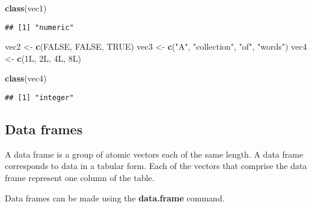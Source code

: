 \documentclass[]{book}
\newenvironment{Shaded}{\begin{snugshade}}{\end{snugshade}}
\newcommand{\KeywordTok}[1]{\textcolor[rgb]{0.13,0.29,0.53}{\textbf{#1}}}
\newcommand{\NormalTok}[1]{#1}
\newcommand{\OtherTok}[1]{\textcolor[rgb]{0.56,0.35,0.01}{#1}}
\newcommand{\StringTok}[1]{\textcolor[rgb]{0.31,0.60,0.02}{#1}}
\begin{document}
\begin{Shaded}
\begin{Highlighting}[]
\KeywordTok{class}\NormalTok{(vec1)}
\end{Highlighting}
\end{Shaded}

\begin{verbatim}
## [1] "numeric"
\end{verbatim}

\begin{Shaded}
\begin{Highlighting}[]
\NormalTok{vec2 <-}\StringTok{ }\KeywordTok{c}\NormalTok{(}\OtherTok{FALSE}\NormalTok{, }\OtherTok{FALSE}\NormalTok{, }\OtherTok{TRUE}\NormalTok{)}
\NormalTok{vec3 <-}\StringTok{ }\KeywordTok{c}\NormalTok{(}\StringTok{"A"}\NormalTok{, }\StringTok{"collection"}\NormalTok{, }\StringTok{"of"}\NormalTok{, }\StringTok{"words"}\NormalTok{)}
\NormalTok{vec4 <-}\StringTok{ }\KeywordTok{c}\NormalTok{(1L, 2L, 4L, 8L)}
\end{Highlighting}
\end{Shaded}

\begin{Shaded}
\begin{Highlighting}[]
\KeywordTok{class}\NormalTok{(vec4)}
\end{Highlighting}
\end{Shaded}

\begin{verbatim}
## [1] "integer"
\end{verbatim}

\hypertarget{dataframes}{%
\subsection*{Data frames}\label{dataframes}}

A data frame is a group of atomic vectors each of the same length. A data frame corresponds to data in a tabular form. Each of the vectors that comprise the data frame represent one column of the table.

Data frames can be made using the \textbf{data.frame} command.
\end{document}
